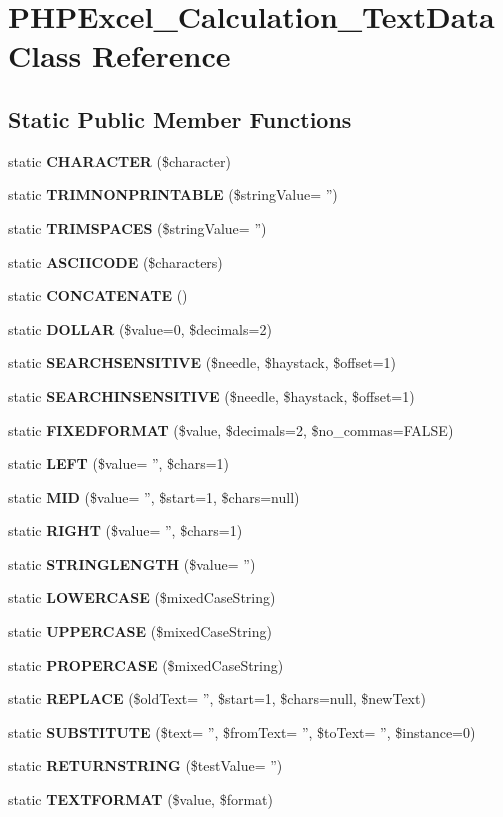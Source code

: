 \section{P\+H\+P\+Excel\+\_\+\+Calculation\+\_\+\+Text\+Data Class Reference}
\label{class_p_h_p_excel___calculation___text_data}
\subsection*{Static Public Member Functions}
\begin{DoxyCompactItemize}
\item 
static {\bf C\+H\+A\+R\+A\+C\+T\+E\+R} (\$character)
\item 
static {\bf T\+R\+I\+M\+N\+O\+N\+P\+R\+I\+N\+T\+A\+B\+L\+E} (\$string\+Value= '')
\item 
static {\bf T\+R\+I\+M\+S\+P\+A\+C\+E\+S} (\$string\+Value= '')
\item 
static {\bf A\+S\+C\+I\+I\+C\+O\+D\+E} (\$characters)
\item 
static {\bf C\+O\+N\+C\+A\+T\+E\+N\+A\+T\+E} ()
\item 
static {\bf D\+O\+L\+L\+A\+R} (\$value=0, \$decimals=2)
\item 
static {\bf S\+E\+A\+R\+C\+H\+S\+E\+N\+S\+I\+T\+I\+V\+E} (\$needle, \$haystack, \$offset=1)
\item 
static {\bf S\+E\+A\+R\+C\+H\+I\+N\+S\+E\+N\+S\+I\+T\+I\+V\+E} (\$needle, \$haystack, \$offset=1)
\item 
static {\bf F\+I\+X\+E\+D\+F\+O\+R\+M\+A\+T} (\$value, \$decimals=2, \$no\+\_\+commas=F\+A\+L\+S\+E)
\item 
static {\bf L\+E\+F\+T} (\$value= '', \$chars=1)
\item 
static {\bf M\+I\+D} (\$value= '', \$start=1, \$chars=null)
\item 
static {\bf R\+I\+G\+H\+T} (\$value= '', \$chars=1)
\item 
static {\bf S\+T\+R\+I\+N\+G\+L\+E\+N\+G\+T\+H} (\$value= '')
\item 
static {\bf L\+O\+W\+E\+R\+C\+A\+S\+E} (\$mixed\+Case\+String)
\item 
static {\bf U\+P\+P\+E\+R\+C\+A\+S\+E} (\$mixed\+Case\+String)
\item 
static {\bf P\+R\+O\+P\+E\+R\+C\+A\+S\+E} (\$mixed\+Case\+String)
\item 
static {\bf R\+E\+P\+L\+A\+C\+E} (\$old\+Text= '', \$start=1, \$chars=null, \$new\+Text)
\item 
static {\bf S\+U\+B\+S\+T\+I\+T\+U\+T\+E} (\$text= '', \$from\+Text= '', \$to\+Text= '', \$instance=0)
\item 
static {\bf R\+E\+T\+U\+R\+N\+S\+T\+R\+I\+N\+G} (\$test\+Value= '')
\item 
static {\bf T\+E\+X\+T\+F\+O\+R\+M\+A\+T} (\$value, \$format)
\end{DoxyCompactItemize}


